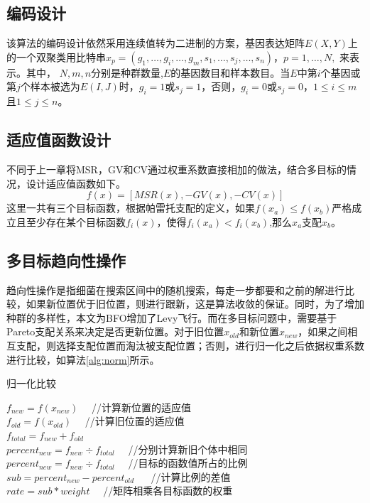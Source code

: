     \subsection{编码设计}
    该算法的编码设计依然采用连续值转为二进制的方案，基因表达矩阵$E(X,Y)$上的一个双聚类用比特串$x_p = (g_1,\dots,g_i,\dots,g_m,s_1,\dots,s_j,\dots,s_n)$，$ p=1,\dots,N, $ 来表示。其中， $N,m,n$分别是种群数量,$E$的基因数目和样本数目。当$E$中第$i$个基因或第$j$个样本被选为$E(I,J)$时，$g_i=1$或$s_j=1$，否则，$g_i=0$或$s_j=0$，$1\le i \le m$ 且$1\le j \le n$。

    \subsection{适应值函数设计}
    不同于上一章将MSR，GV和CV通过权重系数直接相加的做法，结合多目标的情况，设计适应值函数如下。
    \begin{equation}
      f(x) = [MSR(x), -GV(x), -CV(x)]  
    \end{equation}
    这里一共有三个目标函数，根据帕雷托支配的定义，如果$f(x_a)\le f(x_b)$严格成立且至少存在某个目标函数$f_i(x)$，使得$f_i(x_a)<f_i(x_b)$,那么$x_a$支配$x_b$。
    
    \subsection{多目标趋向性操作}
    趋向性操作是指细菌在搜索区间中的随机搜索，每走一步都要和之前的解进行比较，如果新位置优于旧位置，则进行跟新，这是算法收敛的保证。同时，为了增加种群的多样性，本文为BFO增加了Levy飞行。而在多目标问题中，需要基于Pareto支配关系来决定是否更新位置。对于旧位置$x_{old}$和新位置$x_{new}$，如果之间相互支配，则选择支配位置而淘汰被支配位置；否则，进行归一化之后依据权重系数进行比较，如算法\ref{alg:norm}所示。

    \begin{algorithm}[htbp]
    \caption{归一化比较} \label{alg:norm}
    $f_{new} = f(x_{new})$　   //计算新位置的适应值\\
    $f_{old} = f(x_{old})$　 //计算旧位置的适应值\\
    $f_{total} = f_{new} + f_{old}$　   \\
    $percent_{new} = f_{new} \div f_{total}$　 //分别计算新旧个体中相同\\
    $percent_{new} = f_{new} \div f_{total}$　 //目标的函数值所占的比例\\
    $sub = percent_{new} - percent_{old}$ 　 //计算比例的差值\\
    $rate = sub \ast weight$　 //矩阵相乘各目标函数的权重\\
    \end{algorithm}

